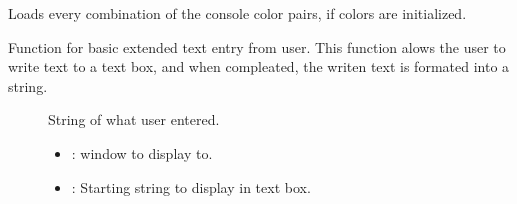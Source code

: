 \documentclass[letterpaper,10pt,english]{sphinxmanual}
\begin{document}
\begin{fulllineitems}
\begin{fulllineitems}
Loads every combination of the console color pairs, if colors are initialized. \begin{description}
\item[{}] \leavevmode
{\hyperref[\detokenize{index:Pessumnamespaceostendo_1aaece4e9a0bcd75df4724bf97c628c12e}]{}} 

\end{description}


\end{fulllineitems}


\begin{fulllineitems}
\label{\detokenize{index:_CPPv2N7ostendo7TextBoxEN7ostendo6WindowENSt6stringE}}%
\pysigstartmultiline
{}\label{\detokenize{index:Pessumnamespaceostendo_1a3d2c591339109330938a42d576c9e81d}}%
\pysigstopmultiline
Function for basic extended text entry from user. This function alows the user to write text to a text box, and when compleated, the writen text is formated into a string. \begin{description}
\item[{}] \leavevmode
String of what user entered. 

\item[{}] \leavevmode
{\hyperref[\detokenize{index:Pessumclassostendo_1_1Window}]{}} 

\item[{}] \leavevmode\begin{itemize}
\item {} 
: window to display to. 

\item {} 
: Starting string to display in text box. 

\end{itemize}

\end{description}


\end{fulllineitems}


\end{fulllineitems}
\end{document}
